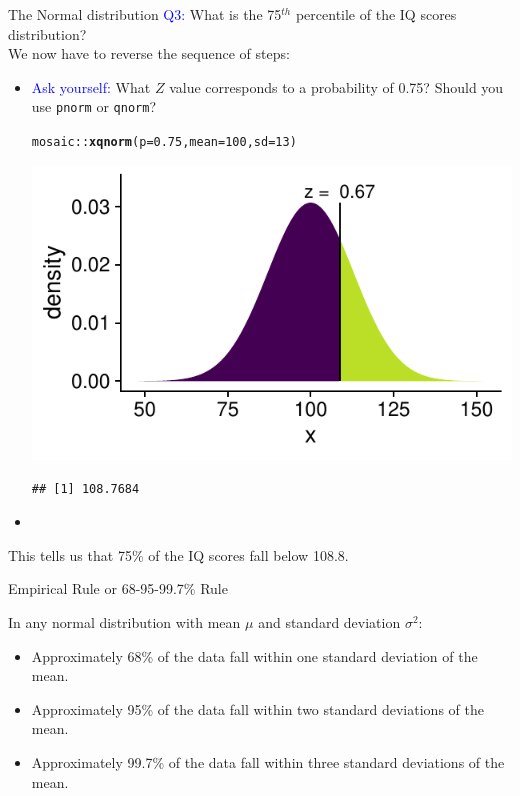 \documentclass[10pt]{beamer}\usepackage[]{graphicx}\usepackage[]{color}
\makeatletter
\newcommand{\hlnum}[1]{\textcolor[rgb]{0.686,0.059,0.569}{#1}}%
\newcommand{\hlopt}[1]{\textcolor[rgb]{0,0,0}{#1}}%
\newcommand{\hlstd}[1]{\textcolor[rgb]{0.345,0.345,0.345}{#1}}%
\newcommand{\hlkwc}[1]{\textcolor[rgb]{0.333,0.667,0.333}{#1}}%
\newcommand{\hlkwd}[1]{\textcolor[rgb]{0.737,0.353,0.396}{\textbf{#1}}}%
\newenvironment{kframe}{%
 \def\at@end@of@kframe{}%
 \ifinner\ifhmode%
  \def\at@end@of@kframe{\end{minipage}}%
  \begin{minipage}{\columnwidth}%
 \fi\fi%
 \def\FrameCommand##1{\hskip\@totalleftmargin \hskip-\fboxsep
 \colorbox{shadecolor}{##1}\hskip-\fboxsep
     \hskip-\linewidth \hskip-\@totalleftmargin \hskip\columnwidth}%
 \MakeFramed {\advance\hsize-\width
   \@totalleftmargin\z@ \linewidth\hsize
   \@setminipage}}%
 {\par\unskip\endMakeFramed%
 \at@end@of@kframe}
\newenvironment{knitrout}{}{} %
\makeatother
\begin{document}
\begin{frame}[fragile]{The Normal distribution}
	\textcolor{blue}{Q3:}
	What is the 75$^{th}$ percentile of the IQ scores distribution? \\
	We now have to reverse the sequence of steps: \pause
	\begin{itemize}
		\item \textcolor{blue}{Ask yourself:} What $Z$ value corresponds to a probability of 0.75? Should you use \texttt{pnorm} or \texttt{qnorm}? \pause
		
\begin{knitrout}\tiny
{}\color{fgcolor}\begin{kframe}
\begin{alltt}
\hlstd{mosaic}\hlopt{::}\hlkwd{xqnorm}\hlstd{(}\hlkwc{p} \hlstd{=} \hlnum{0.75}\hlstd{,} \hlkwc{mean} \hlstd{=} \hlnum{100}\hlstd{,} \hlkwc{sd} \hlstd{=} \hlnum{13}\hlstd{)}
\end{alltt}
\end{kframe}

{\centering \includegraphics[width=0.6\linewidth]{figure/probs8-1} 

}


\begin{kframe}\begin{verbatim}
## [1] 108.7684
\end{verbatim}
\end{kframe}
\end{knitrout}
		
		\item[]
	\end{itemize} This tells us that 75\% of the IQ scores fall below 108.8. 
\end{frame}


\begin{frame}[fragile]{Empirical Rule or 68-95-99.7\% Rule}
	
	In any normal distribution with mean $\mu$ and standard deviation $\sigma^2$:
	\begin{itemize}
		\setlength\itemsep{2em}
		\item Approximately 68\% of the data fall within one standard deviation of the mean.
		\item Approximately 95\% of the data fall within two standard deviations of the mean.
		\item Approximately 99.7\% of the data fall within three standard deviations of the mean.
	\end{itemize}
\end{frame}
\end{document}
